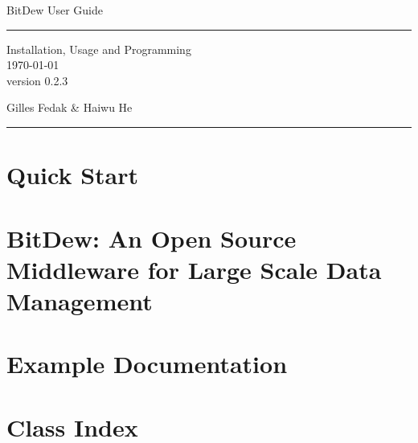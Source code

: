 \documentclass[a4paper]{book}
\begin{document}
\hypersetup{pageanchor=false}
\begin{titlepage}
\vspace*{2cm}
\null\vfil
\begin{flushleft}
  \huge BitDew User Guide
\end{flushleft}
\par
\hrule height 4pt
\par
\begin{flushright}
  \LARGE Installation, Usage and Programming \\
\large \today\\
 version 0.2.3 \\
\par
\end{flushright}
\vfil\null
\vspace*{8cm}
\begin{flushleft}
\huge Gilles Fedak \& Haiwu He
\end{flushleft}
\par
\hrule height 4pt
\par
\normalsize
\end{titlepage}
\clearemptydoublepage
{}
\tableofcontents
\clearemptydoublepage
{}
\hypersetup{pageanchor=true}
\chapter{Quick Start}
\label{index}\hypertarget{index}{}
\chapter{BitDew: An Open Source Middleware for Large Scale Data Management}




\chapter{Example Documentation}




\chapter{Class Index}





\end{document}
